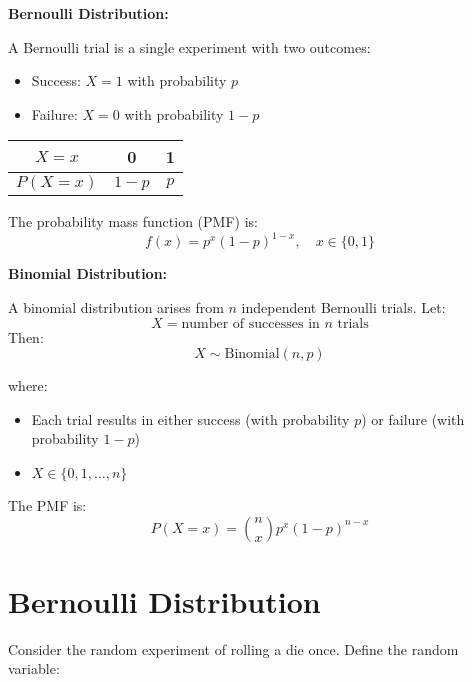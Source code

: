 \begin{tcolorbox}[title=Review from STA256,
  colback=gray!5, 
  colframe=gray!40!black, 
  coltitle=black, 
  colbacktitle=gray!20,  %
  fonttitle=\bfseries,
  sharp corners=south,
  breakable]


\textbf{Bernoulli Distribution:}

A Bernoulli trial is a single experiment with two outcomes:
\begin{itemize}
  \item Success: \( X = 1 \) with probability \( p \)
  \item Failure: \( X = 0 \) with probability \( 1 - p \)
\end{itemize}

\medskip

\begin{center}
\renewcommand{\arraystretch}{1.3}
\begin{tabular}{|c|c|c|}
\hline
\( X = x \) & 0 & 1 \\
\hline
\( P(X = x) \) & \( 1 - p \) & \( p \) \\
\hline
\end{tabular}
\end{center}

The probability mass function (PMF) is:
\[
f(x) = p^x (1 - p)^{1 - x}, \quad x \in \{0, 1\}
\]

\medskip

\textbf{Binomial Distribution:}

A binomial distribution arises from \( n \) independent Bernoulli trials. Let:
\[
X = \text{number of successes in } n \text{ trials}
\]
Then:
\[
X \sim \text{Binomial}(n, p)
\]

where:
\begin{itemize}
  \item Each trial results in either success (with probability \( p \)) or failure (with probability \( 1 - p \))
  \item \( X \in \{0, 1, \dots, n\} \)
\end{itemize}

The PMF is:
\[
P(X = x) = \binom{n}{x} p^x (1 - p)^{n - x}
\]

\end{tcolorbox}

\section{Bernoulli Distribution}

Consider the random experiment of rolling a die once. Define the random variable:

